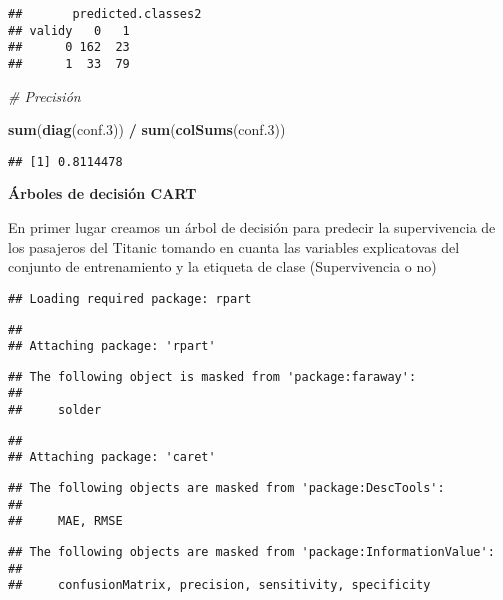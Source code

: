 \documentclass[
]{article}
\newenvironment{Shaded}{\begin{snugshade}}{\end{snugshade}}
\newcommand{\CommentTok}[1]{\textcolor[rgb]{0.56,0.35,0.01}{\textit{#1}}}
\newcommand{\FloatTok}[1]{\textcolor[rgb]{0.00,0.00,0.81}{#1}}
\newcommand{\KeywordTok}[1]{\textcolor[rgb]{0.13,0.29,0.53}{\textbf{#1}}}
\newcommand{\NormalTok}[1]{#1}
\newcommand{\OperatorTok}[1]{\textcolor[rgb]{0.81,0.36,0.00}{\textbf{#1}}}
\newcommand{\StringTok}[1]{\textcolor[rgb]{0.31,0.60,0.02}{#1}}
\begin{document}
\begin{verbatim}
##       predicted.classes2
## validy   0   1
##      0 162  23
##      1  33  79
\end{verbatim}

\begin{Shaded}
\begin{Highlighting}[]
\CommentTok{# Precisión}

\KeywordTok{sum}\NormalTok{(}\KeywordTok{diag}\NormalTok{(conf}\FloatTok{.3}\NormalTok{)) }\OperatorTok{/}\StringTok{ }\KeywordTok{sum}\NormalTok{(}\KeywordTok{colSums}\NormalTok{(conf}\FloatTok{.3}\NormalTok{))}
\end{Highlighting}
\end{Shaded}

\begin{verbatim}
## [1] 0.8114478
\end{verbatim}

\texttt{} \texttt{}

\textbf{Árboles de decisión CART}\\
\texttt{}

En primer lugar creamos un árbol de decisión para predecir la
supervivencia de los pasajeros del Titanic tomando en cuanta las
variables explicatovas del conjunto de entrenamiento y la etiqueta de
clase (Supervivencia o no)\\
\texttt{}

\begin{verbatim}
## Loading required package: rpart
\end{verbatim}

\begin{verbatim}
## 
## Attaching package: 'rpart'
\end{verbatim}

\begin{verbatim}
## The following object is masked from 'package:faraway':
## 
##     solder
\end{verbatim}

\begin{verbatim}
## 
## Attaching package: 'caret'
\end{verbatim}

\begin{verbatim}
## The following objects are masked from 'package:DescTools':
## 
##     MAE, RMSE
\end{verbatim}

\begin{verbatim}
## The following objects are masked from 'package:InformationValue':
## 
##     confusionMatrix, precision, sensitivity, specificity
\end{verbatim}
\end{document}
